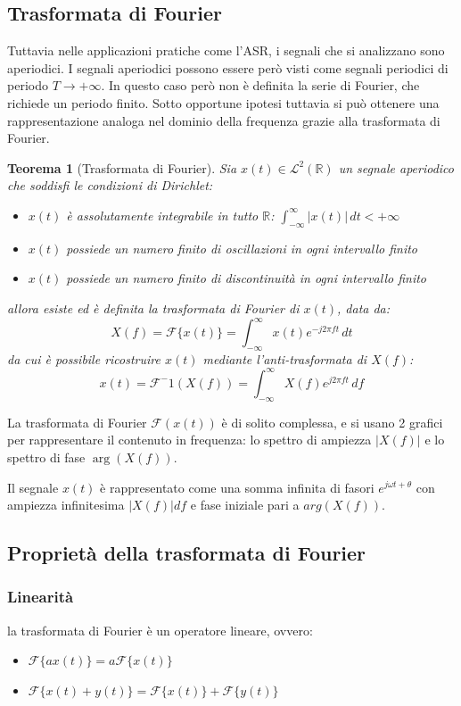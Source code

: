 \documentclass[12pt, a4paper]{article}
\newtheorem*{theorem}{Teorema}
\begin{document}
\subsection{Trasformata di Fourier}
Tuttavia nelle applicazioni pratiche come l'ASR, i segnali che si analizzano sono aperiodici. I segnali aperiodici possono essere però visti come segnali periodici di periodo $T \to +\infty$. In questo caso però non è definita la serie di Fourier, che richiede un periodo finito. Sotto opportune ipotesi tuttavia si può ottenere una rappresentazione analoga nel dominio della frequenza grazie alla trasformata di Fourier.

\begin{theorem}[Trasformata di Fourier]

  Sia $x(t) \in \mathcal{L}^2(\mathbb{R})$ un segnale aperiodico che soddisfi le condizioni di Dirichlet:
  \begin{itemize}
    \item $x(t)$ è assolutamente integrabile in tutto $\mathbb{R}$: $\int_{-\infty}^{\infty} |x(t)| \, dt < +\infty$
    \item $x(t)$ possiede un numero finito di oscillazioni in ogni intervallo finito
    \item $x(t)$ possiede un numero finito di discontinuità in ogni intervallo finito
  \end{itemize}
  allora esiste ed è definita la trasformata di Fourier di $x(t)$, data da:
  \[
    X(f) = \mathcal{F}\{x(t)\} = \int_{-\infty}^{\infty} x(t) e^{-j 2\pi f t} \, dt
  \]
  da cui è possibile ricostruire $x(t)$ mediante l'anti-trasformata di $X(f)$:
  \[
    x(t) = \mathcal{F}^-1(X(f)) = \int_{-\infty}^{\infty} X(f) e^{j 2\pi f t} \, df
  \]
\end{theorem}

La trasformata di Fourier $\mathcal{F}(x(t))$ è di solito complessa, e si usano 2 grafici per rappresentare il contenuto in frequenza: lo spettro di ampiezza $|X(f)|$ e lo spettro di fase $\arg(X(f))$.
\medskip

Il segnale $x(t)$ è rappresentato come una somma infinita di fasori $e^{j \omega t+\theta}$ con ampiezza infinitesima $\vert X(f)\vert df$ e fase iniziale pari a $arg(X(f))$.

\subsection{Proprietà della trasformata di Fourier}

\subsubsection{Linearità}  la trasformata di Fourier è un operatore lineare, ovvero:
\begin{itemize}
  \item $\mathcal{F}\{ax(t)\} = a \mathcal{F}\{x(t)\}$
  \item $\mathcal{F}\{x(t) + y(t)\} = \mathcal{F}\{x(t)\} + \mathcal{F}\{y(t)\}$
\end{itemize}
\end{document}
